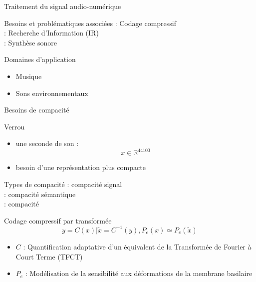 \begin{frame}{Traitement du signal audio-numérique}
\begin{block}{Besoins et problématiques associées}
: Codage compressif \\
: Recherche d'Information (IR) \\
: Synthèse sonore
\end{block}
\begin{block}{Domaines d'application}
\begin{itemize}
\item Musique
\item Sons environnementaux
\end{itemize}
\end{block}
\end{frame}


\begin{frame}{Besoins de compacité}
\begin{block}{Verrou}
\begin{itemize}
\item une seconde de son : $$ x \in \mathbb{R}^{44100}$$
\item besoin d'une représentation plus \alert{compacte}
\end{itemize}
\end{block}
\begin{block}{Types de compacité}
: compacité signal \\ %
: compacité sémantique \\ %
: compacité \alert{\og}  \alert{\fg} \\ %
\end{block}
\end{frame}

\begin{frame}{Codage compressif par transformée}
$$y = C(x) | \tilde{x} = C^{-1}(y), P_e(x) \simeq P_e(\tilde{x})$$
\begin{itemize}
\item $C$ : Quantification adaptative d'un équivalent de la Transformée de Fourier à Court Terme (TFCT)
\item $P_e$ : Modélisation de la sensibilité aux déformations de la membrane basilaire
\end{itemize}
\end{frame}


